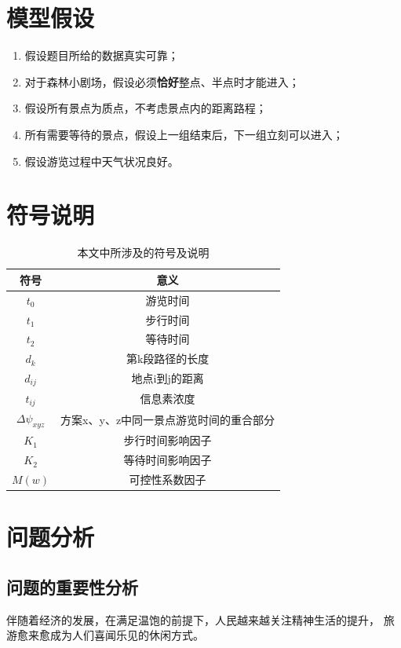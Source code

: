 \documentclass[hyperref,UTF8]{article}
\begin{document}
{\section{模型假设}
\begin{enumerate}
\item 假设题目所给的数据真实可靠；
\item 对于森林小剧场，假设必须\textbf{恰好}整点、半点时才能进入；
\item 假设所有景点为质点，不考虑景点内的距离路程；
\item 所有需要等待的景点，假设上一组结束后，下一组立刻可以进入；
\item 假设游览过程中天气状况良好。
\end{enumerate}






\section{符号说明}
\begin{table}[htbp]
\centering
\caption{本文中所涉及的符号及说明}
\begin{tabular}{cc}
\toprule
符号&意义\\
\midrule
$t_0$ & 游览时间\\
$t_1$ & 步行时间\\
$t_2$ & 等待时间\\
$d_k$ & 第k段路径的长度\\
$d_{ij}$ & 地点i到j的距离\\
$t_{ij}$ & 信息素浓度\\
$\Delta \psi_{xyz}$ & 方案x、y、z中同一景点游览时间的重合部分\\
$K_1$ & 步行时间影响因子\\
$ K_2$ & 等待时间影响因子\\
$M(w)$ & 可控性系数因子\\
\bottomrule
\end{tabular}
 \label{abs}
\end{table}











\section{问题分析}
\subsection{问题的重要性分析}
伴随着经济的发展，在满足温饱的前提下，人民越来越关注精神生活的提升，
旅游愈来愈成为人们喜闻乐见的休闲方式。

}
\end{document}
